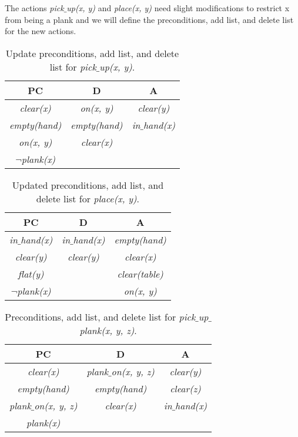 \documentclass[11pt, letterpaper]{hw}
\begin{document}
\begin{enumerate}
The actions \textit{pick$\_$up(x, y)} and \textit{place(x, y)} need slight modifications to restrict x from being a plank and we will define the preconditions, add list, and delete list for the new actions.

\begin{table}[H]
\centering
{\renewcommand{\arraystretch}{1.2}%
\begin{tabular}{| c | c | c |}
\hline
\textbf{PC} & \textbf{D} & \textbf{A}\\
\hline
\textit{clear(x)} & \textit{on(x, y)} & \textit{clear(y)}\\ \hline
\textit{empty(hand)} & \textit{empty(hand)} & \textit{in$\_$hand(x)}\\ \hline
\textit{on(x, y)} & \textit{clear(x)} &  \\ \hline
$\neg$\textit{plank(x)} & & \\ \hline
\end{tabular}}
\caption{Update preconditions, add list, and delete list for \textit{pick$\_$up(x, y)}.}
\end{table}

\begin{table}[H]
\centering
{\renewcommand{\arraystretch}{1.2}%
\begin{tabular}{| c | c | c |}
\hline
\textbf{PC} & \textbf{D} & \textbf{A}\\
\hline
\textit{in$\_$hand(x)} & \textit{in$\_$hand(x)} & \textit{empty(hand)}\\ \hline
\textit{clear(y)} & \textit{clear(y)} & \textit{clear(x)}\\ \hline
\textit{flat(y)} &  & \textit{clear(table)} \\ \hline
$\neg$\textit{plank(x)}& & \textit{on(x, y)} \\ \hline
\end{tabular}}
\caption{Updated preconditions, add list, and delete list for \textit{place(x, y)}.}
\end{table}

\begin{table}[H]
\centering
{\renewcommand{\arraystretch}{1.2}%
\begin{tabular}{| c | c | c |}
\hline
\textbf{PC} & \textbf{D} & \textbf{A}\\
\hline
\textit{clear(x)} & \textit{plank$\_$on(x, y, z)} & \textit{clear(y)}\\ \hline
\textit{empty(hand)} & \textit{empty(hand)} & \textit{clear(z)}\\ \hline
\textit{plank$\_$on(x, y, z)} & \textit{clear(x)} &  \textit{in$\_$hand(x)}\\ \hline
\textit{plank(x)} & & \\ \hline
\end{tabular}}
\caption{Preconditions, add list, and delete list for \textit{pick$\_$up$\_$plank(x, y, z)}.}
\end{table}


\end{enumerate}
\end{document}
